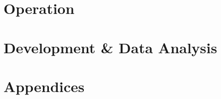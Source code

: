 \documentclass[a4paper, 11pt, oneside]{book}
\begin{document}


\part{Operation}





\part{Development \& Data Analysis}



\part{Appendices}
\appendix






\end{document}
